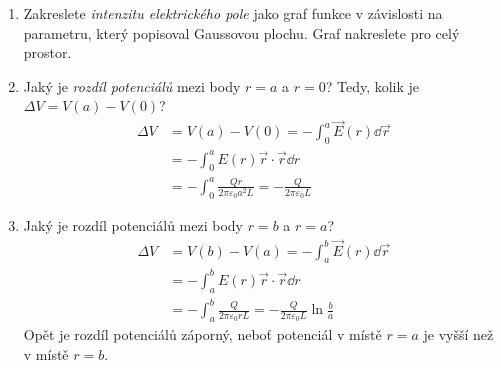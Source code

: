 \begin{mdframed}[style=mdexam]
\begin{example}
\begin{enumerate}[noitemsep]
{            bodu, vyjádřete velikost intenzity elektrického pole.}
            \begin{equation*}
              2\pi r h E = \frac{1}{\varepsilon_0}\dfrac{r^2h}{a^2L}Q 
              \Rightarrow E = \frac{Qr}{2\pi\varepsilon_0a^2L}
            \end{equation*}
            \emph{Zopakujte stejnou proceduru pro oblast \(a < r < b\), vyjádřete intenzitu
            elektrického pole jako funkci \(r\).} Náboj, který je uzavřen v ploše je konstantní, se
            vzrůstajícím poloměrem r se však mění celková plocha válce.
            \begin{equation*}
              2\pi\,r\,h\,E = \frac{1}{\varepsilon_0}\dfrac{h}{L}Q 
              \Rightarrow E = \frac{Q}{2\pi\varepsilon_0rL}
            \end{equation*}
      \item Zakreslete \emph{intenzitu elektrického pole} jako graf funkce v závislosti na
            parametru, který popisoval Gaussovou plochu. Graf nakreslete pro celý prostor. 
            
            {\centering
              \captionsetup{type=figure}
              \par}
      \item Jaký je \emph{rozdíl potenciálů} mezi body \(r = a\) a \(r = 0\)? Tedy, kolik je
            \(\Delta V = V(a) − V(0)\)? 
            \begin{align*}
              \Delta V  &= V(a) − V(0) = -\int_0^a\vec{E}(r)\dd\vec{r}   \\
                        &= -\int_{0}^{a}E(r)\vec{r}\cdot\vec{r}\dd{r}    \\
                        &= -\int_{0}^{a}\frac{Qr}{2\pi\varepsilon_0a^2L} 
                         = -\frac{Q}{2\pi\varepsilon_0L}
            \end{align*}
      \item Jaký je rozdíl potenciálů mezi body \(r = b\) a \(r = a\)?
            \begin{align*}
              \Delta V  &= V(b) − V(a) = -\int_a^b\vec{E}(r)\dd\vec{r} \\   
                        &= -\int_a^b E(r)\vec{r}\cdot\vec{r}\dd{r}     \\
                        &= -\int_a^b \frac{Q}{2\pi\varepsilon_0rL} 
                         = -\frac{Q}{2\pi\varepsilon_0L}\ln\frac{b}{a}
            \end{align*}
            Opět je rozdíl potenciálů záporný, neboť potenciál v místě \(r = a\) je vyšší než v
            místě \(r = b\).
    \end{enumerate}
  \end{example}
\end{mdframed}